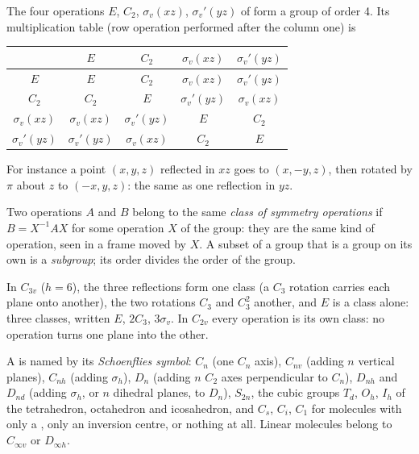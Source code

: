 \begin{example}\label{ex:b3:point-groups:c2v}
The four operations $E$, $C_2$, $\sigma_v(xz)$, $\sigma_v'(yz)$ of  form a
group of order 4. Its multiplication table (row operation performed after the
column one) is
\begin{center}\small
\begin{tabular}{c|cccc}
\hline
 & $E$ & $C_2$ & $\sigma_v(xz)$ & $\sigma_v'(yz)$\\ \hline
$E$ & $E$ & $C_2$ & $\sigma_v(xz)$ & $\sigma_v'(yz)$\\
$C_2$ & $C_2$ & $E$ & $\sigma_v'(yz)$ & $\sigma_v(xz)$\\
$\sigma_v(xz)$ & $\sigma_v(xz)$ & $\sigma_v'(yz)$ & $E$ & $C_2$\\
$\sigma_v'(yz)$ & $\sigma_v'(yz)$ & $\sigma_v(xz)$ & $C_2$ & $E$\\ \hline
\end{tabular}
\end{center}
For instance a point $(x, y, z)$ reflected in $xz$ goes to $(x, -y, z)$, then
rotated by $\pi$ about $z$ to $(-x, y, z)$: the same as one reflection in
$yz$.
\end{example}

\begin{definition}\label{def:b3:point-groups:class}
Two operations $A$ and $B$ belong to the same \emph{class of symmetry
operations} if $B = X^{-1}AX$ for some
operation $X$ of the group: they are the same kind of operation, seen in a
frame moved by $X$. A subset of a group that is a group on its own is a
\emph{subgroup}; its order divides the order of the group.
\end{definition}

\begin{example}[Classes of \ce{NH3}]\label{ex:b3:point-groups:classes}
In $C_{3v}$ ($h = 6$), the three reflections form one class (a $C_3$ rotation
carries each plane onto another), the two rotations $C_3$ and $C_3^2$ another,
and $E$ is a class alone: three classes, written $E$, $2C_3$, $3\sigma_v$. In
$C_{2v}$ every operation is its own class: no operation turns one plane into
the other.
\end{example}

\begin{definition}\label{def:b3:point-groups:schoenflies}
A  is named by its \emph{Schoenflies symbol}:
$C_n$ (one $C_n$ axis), $C_{nv}$ (adding $n$ vertical planes), $C_{nh}$
(adding $\sigma_h$), $D_n$ (adding $n$ $C_2$ axes perpendicular to $C_n$), $D_{nh}$
and $D_{nd}$ (adding $\sigma_h$, or $n$ dihedral planes, to $D_n$), $S_{2n}$, the
cubic groups $T_d$, $O_h$, $I_h$ of the tetrahedron, octahedron and
icosahedron, and $C_s$, $C_i$, $C_1$ for molecules with only a ,
only an inversion centre, or nothing at all. Linear molecules belong to
$C_{\infty v}$ or $D_{\infty h}$.
\end{definition}

